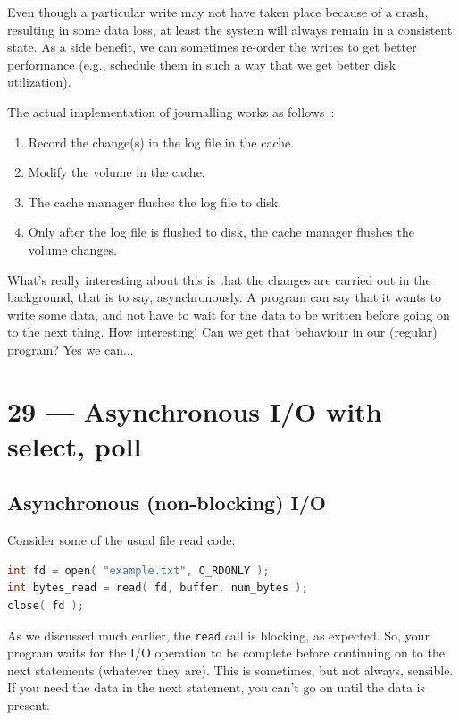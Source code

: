 \documentclass[a4paper]{report}
\begin{document}
Even though a particular write may not have taken place because of a crash, resulting in some data loss, at least the system will always remain in a consistent state. As a side benefit, we can sometimes re-order the writes to get better performance (e.g., schedule them in such a way that we get better disk utilization).


The actual implementation of journalling works as follows~\cite{russ}:

\begin{enumerate}
	\item Record the change(s) in the log file in the cache.
	\item Modify the volume in the cache.
	\item The cache manager flushes the log file to disk.
	\item Only after the log file is flushed to disk, the cache manager flushes the volume changes.
\end{enumerate}

What's really interesting about this is that the changes are carried out in the background, that is to say, asynchronously. A program can say that it wants to write some data, and not have to wait for the data to be written before going on to the next thing. How interesting! Can we get that behaviour in our (regular) program? Yes we can...








\chapter*{29 --- Asynchronous I/O with select, poll}


\section*{Asynchronous (non-blocking) I/O}
Consider some of the usual file read code:

\begin{lstlisting}[language=C]
int fd = open( "example.txt", O_RDONLY );
int bytes_read = read( fd, buffer, num_bytes );
close( fd );
\end{lstlisting}

As we discussed much earlier, the \texttt{read} call is blocking, as expected. So, your program waits for the I/O operation to be complete before continuing on to the next statements (whatever they are). This is sometimes, but not always, sensible. If you need the data in the next statement, you can't go on until the data is present.
\end{document}
